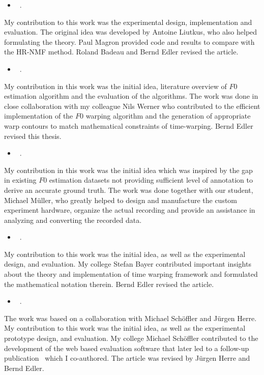 \begin{itemize}
  \item[\cite{stoeter16}] ~.
\end{itemize}
\noindent
My contribution to this work was the experimental design, implementation and evaluation.
The original idea was developed by Antoine Liutkus, who also helped formulating the theory. Paul Magron provided code and results to compare with the HR-NMF method. Roland Badeau and Bernd Edler revised the article.

\begin{itemize}
  \item[\cite{stoeter15icassp}] ~.
\end{itemize}
\noindent
My contribution in this work was the initial idea, literature overview of $F0$ estimation algorithm and the evaluation of the algorithms.
The work was done in close collaboration with my colleague Nils Werner who contributed to the efficient implementation of the $F0$ warping algorithm and the generation of appropriate warp contours to match mathematical constraints of time-warping. Bernd Edler revised this thesis.

\begin{itemize}
  \item[\cite{stoeter15acm}] ~.
\end{itemize}
\noindent
My contribution in this work was the initial idea which was inspired by the gap in existing $F0$ estimation datasets not providing sufficient level of annotation to derive an accurate ground truth.
The work was done together with our student, Michael Müller, who greatly helped to design and manufacture the custom experiment hardware, organize the actual recording and provide an assistance in analyzing and converting the recorded data.

\begin{itemize}
  \item[\cite{stoeter14}] ~.
\end{itemize}
\noindent
My contribution to this work was the initial idea, as well as the experimental design, and evaluation.
My college Stefan Bayer contributed important insights about the theory and implementation of time warping framework and formulated the mathematical notation therein. Bernd Edler revised the article.

\begin{itemize}
  \item[\cite{stoeter13}] ~.
\end{itemize}
\noindent
The work was based on a collaboration with Michael Schöffler and Jürgen Herre.
My contribution to this work was the initial idea, as well as the experimental prototype design, and evaluation.
My college Michael Schöffler contributed to the development of the web based evaluation software that later led to a follow-up publication~\cite{schoeffler13} which I co-authored. The article was revised by Jürgen Herre and Bernd Edler.



